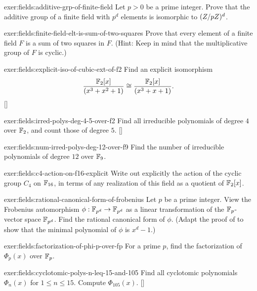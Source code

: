 \begin{exer}{}{exer:fields:additive-grp-of-finite-field}
  Let $p > 0$ be a prime integer. Prove that the additive group of a
  finite field with $p^d$ elements is isomorphic to $(Z/pZ)^d$.
\end{exer}
\begin{exer}{}{exer:fields:finite-field-elt-is-sum-of-two-squares}
  Prove that every element of a finite field $F$ is a sum of two
  squares in $F$. (Hint: Keep in mind that the multiplicative group of
  $F$ is cyclic.)
\end{exer}
\begin{exer}{}{exer:fields:explicit-iso-of-cubic-ext-of-f2}
  Find an explicit isomorphism
  \[
    \frac{\mathbb{F}_2[x]}{(x^3+x^2+1)} \cong \frac{\mathbb{F}_2[x]}{(x^3+x+1)}.
  \] []
\end{exer}
\begin{exer}{}{exer:fields:irred-polys-deg-4-5-over-f2}
  Find all irreducible polynomials of degree $4$ over $\mathbb{F}_2$, and
  count those of degree $5$. []
\end{exer}
\begin{exer}{}{exer:fields:num-irred-polys-deg-12-over-f9}
  Find the number of irreducible polynomials of degree $12$ over
  $\mathbb{F}_9$.
\end{exer}
\begin{exer}{}{exer:fields:c4-action-on-f16-explicit}
  Write out explicitly the action of the cyclic group $C_4$ on
  $\mathbb{F}_{16}$, in terms of any realization of this field as a quotient
  of $\mathbb{F}_2[x]$.
\end{exer}
\begin{exer}{}{exer:fields:rational-canonical-form-of-frobenius}
  Let $p$ be a prime integer. View the Frobenius automorphism
  $\phi : \mathbb{F}_{p^d} \to \mathbb{F}_{p^d}$ as a linear transformation of the
  $\mathbb{F}_p$-vector space $\mathbb{F}_{p^d}$.  Find the rational canonical form of
  $\phi$. (Adapt the proof of  to show that the
  minimal polynomial of $\phi$ is $x^d - 1$.)
\end{exer}
\begin{exer}{}{exer:fields:factorization-of-phi-p-over-fp}
  For a prime $p$, find the factorization of $\Phi_p(x)$ over $\mathbb{F}_p$.
\end{exer}
\begin{exer}{}{exer:fields:cyclotomic-polys-n-leq-15-and-105}
  Find all cyclotomic polynomials $\Phi_n(x)$ for $1 \leq n \leq 15$.
  Compute
  $\Phi_{105}(x)$. []
\end{exer}
